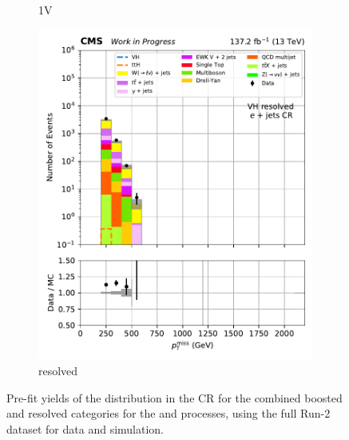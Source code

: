 \begin{figure}[htbp]
\begin{subfigure}[b]{0.24\textwidth}
        \caption{\VH 1V}
    \end{subfigure}
    \hfill
    \begin{subfigure}[b]{0.24\textwidth}
        \includegraphics[width=\textwidth]{figures/region_plots/2016to18/region_3/VH_resolved.pdf}
        \caption{\VH resolved}
    \end{subfigure}
    \caption[Pre-fit yields of the \ptmiss distribution in the \singleEleCr control region for the combined boosted and resolved categories for the \ttH and \VH processes, using the full Run-2 dataset for data and simulation]{Pre-fit yields of the \ptmiss distribution in the \singleEleCr \gls{CR} for the combined boosted and resolved categories for the \ttH and \VH processes, using the full Run-2 dataset for data and simulation.}
    \label{fig:htoinv_cr_yields_comb2016to18_single_electron}
\end{figure}

